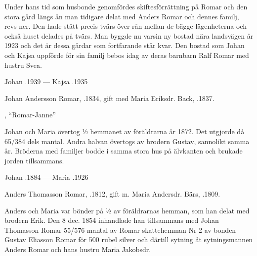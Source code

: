 Under hans tid som husbonde genomfördes skiftesförrättning på Romar och den stora gård längs ån man tidigare delat med Anders Romar och dennes familj, revs ner. Den hade stått precis tvärs över rån mellan de bägge lägenheterna och också huset delades på tvärs. Man byggde nu varsin ny bostad nära landsvägen år 1923 och det är dessa gårdar som fortfarande står kvar. Den bostad som Johan och Kajsa uppförde för sin familj bebos idag av deras barnbarn Ralf Romar med hustru Svea.

Johan .1939  ---  Kajsa .1935



Johan Andersson Romar, .1834, gift med Maria Eriksdr. Back, .1837.
\begin{jhchildren}
  \item {}
  \item {}, ``Romar-Janne''
  \item {}
\end{jhchildren}
Johan och Maria övertog ½ hemmanet av föräldrarna år 1872. Det utgjorde då 65/384 dels mantal. Andra halvan övertogs av brodern Gustav, sannolikt samma år. Bröderna med familjer bodde i samma stora hus på älvkanten och brukade jorden tillsammans.

Johan .1884  ---  Maria .1926


Anders Thomasson Romar, .1812, gift m. Maria Andersdr. Bärs, .1809.
\begin{jhchildren}
  \item {}
  \item {}
  \item {}
  \item {}
  \item {}
  \item {}
  \item {}
  \item {}
\end{jhchildren}
Anders och Maria var bönder på ½ av föräldrarnas hemman, som han delat med brodern Erik. Den 8 dec. 1854 inhandlade han tillsammans med Johan Thomasson Romar 55/576 mantal av Romar skattehemman Nr 2 av bonden Gustav Eliasson Romar för 500 rubel silver och därtill sytning åt sytningsmannen Anders Romar och hans hustru Maria Jakobsdr.

